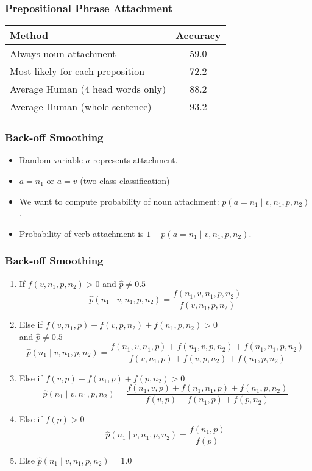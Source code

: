 \begin{frame}
\frametitle{Prepositional Phrase Attachment}
\begin{tabular}{|l|c|}  \hline
Method & Accuracy \\ \hline
Always noun attachment & 59.0 \\
Most likely for each preposition & 72.2 \\
Average Human (4 head words only) & 88.2 \\
Average Human (whole sentence) & 93.2 \\  \hline
\end{tabular}

\end{frame}

\begin{frame}
\frametitle{Back-off Smoothing}
\begin{itemize}[<+->]
\item Random variable $a$ represents attachment. 
\item $a = n_1$ or $a = v$ (two-class classification)
\item We want to compute probability of noun attachment: $p(a = n_1 \mid v, n_1, p, n_2)$. 
\item Probability of verb attachment is $1 - p(a = n_1 \mid v, n_1, p, n_2)$.
\end{itemize}
\end{frame}

\begin{frame}
\frametitle{Back-off Smoothing}
\begin{enumerate}
\item<1-> If $f(v,n_1,p,n_2) > 0$ and $\hat{p} \neq 0.5$
\[ \hat{p}(n_1 \mid  v,n_1,p,n_2) = \frac{ f(n_1,v,n_1,p,n_2) }{ f(v,n_1,p,n_2)
} \]
\item<2-> Else if $f(v,n_1,p) + f(v,p,n_2) + f(n_1,p,n_2) > 0$ \\
and $\hat{p} \neq 0.5$
\[ \hat{p}(n_1 \mid  v,n_1,p,n_2) = \frac{ f(n_1,v,n_1,p) + f(n_1,v,p,n_2) +
  f(n_1,n_1,p,n_2) }{ f(v,n_1,p) + f(v,p,n_2) + f(n_1,p,n_2) } \]
\item<3-> Else if $f(v,p) + f(n_1,p) + f(p,n_2) > 0$
\[ \hat{p}(n_1 \mid  v,n_1,p,n_2) = \frac{ f(n_1,v,p) + f(n_1,n_1,p) +
  f(n_1,p,n_2) }{ f(v,p) + f(n_1,p) + f(p,n_2) } \]
\item<4-> Else if $f(p) > 0$ 
\[ \hat{p}(n_1 \mid  v,n_1,p,n_2) = \frac{ f(n_1,p) }{ f(p) } \]
\item<5-> Else \( \hat{p}(n_1 \mid  v,n_1,p,n_2) = 1.0 \)
\end{enumerate}
\end{frame}

